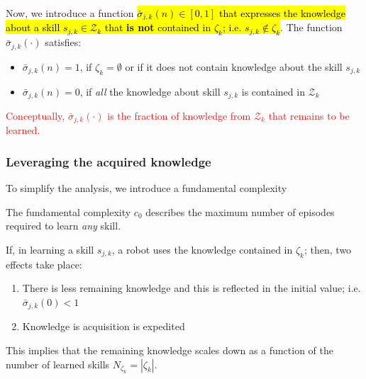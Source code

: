 Now, we introduce a function \hl{$\bar{\sigma}_{j,k}\left(n\right)\in [0,1]$ that expresses the knowledge about a skill $s_{j,k} \in \mathcal{Z}_k$ that \textbf{is not} contained in $\mathcal{\zeta}_k$; i.e. $s_{j,k} \notin \mathcal{\zeta}_k$}. The function $\bar{\sigma}_{j,k}(\cdot)$ satisfies:
\begin{itemize}
	\item $\bar{\sigma}_{j,k}\left(n\right) = 1$, if $\mathcal{\zeta}_k=\emptyset$ or if it does not contain knowledge about the skill $s_{j,k}$
	\item $\bar{\sigma}_{j,k}\left(n\right) = 0$, if \emph{all} the knowledge about skill $s_{j,k}$ is contained in $\mathcal{Z}_k$
\end{itemize} 
\textcolor{red}{Conceptually, $\bar{\sigma}_ {j,k}\left(\cdot\right)$ is the fraction of knowledge from ${\mathcal{Z}_k}$ that remains to be learned.}
\subsubsection{\textbf{Leveraging the acquired knowledge}}
To simplify the analysis, we introduce a fundamental complexity
\begin{tcolorbox}
\begin{assumption}\label{assumption:fundamental_complexity} The fundamental complexity $c_0$ describes the maximum number of episodes required to learn \emph{any} skill.
\end{assumption}
\end{tcolorbox}
If, in learning a skill $ s_{j,k} $, a robot uses the knowledge contained in $\mathcal{\zeta}_k$; then, two effects take place:
\begin{enumerate}
	\item There is less remaining knowledge and this is reflected in the initial value; i.e. $\bar{\sigma}_{j,k}(0) < 1$
	\item Knowledge is acquisition is expedited 
\end{enumerate}
This implies that the remaining knowledge scales down as a function of the number of learned skills $N_{\zeta_k}=|\mathcal{\zeta}_k|$.%

